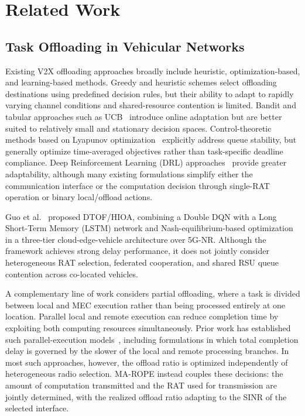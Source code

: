 \section{Related Work}

\subsection{Task Offloading in Vehicular Networks}

Existing V2X offloading approaches broadly include heuristic, optimization-based, and learning-based methods. Greedy and heuristic schemes select offloading destinations using predefined decision rules, but their ability to adapt to rapidly varying channel conditions and shared-resource contention is limited. Bandit and tabular approaches such as UCB~\cite{auer2002} introduce online adaptation but are better suited to relatively small and stationary decision spaces. Control-theoretic methods based on Lyapunov optimization~\cite{mao2016} explicitly address queue stability, but generally optimize time-averaged objectives rather than task-specific deadline compliance. Deep Reinforcement Learning (DRL) approaches~\cite{xiong2021,lowe2017} provide greater adaptability, although many existing formulations simplify either the communication interface or the computation decision through single-RAT operation or binary local/offload actions.

Guo et al.~\cite{guo2026} proposed DTOF/HIOA, combining a Double DQN with a Long Short-Term Memory (LSTM) network and Nash-equilibrium-based optimization in a three-tier cloud-edge-vehicle architecture over 5G-NR. Although the framework achieves strong delay performance, it does not jointly consider heterogeneous RAT selection, federated cooperation, and shared RSU queue contention across co-located vehicles.

A complementary line of work considers partial offloading, where a task is divided between local and MEC execution rather than being processed entirely at one location. Parallel local and remote execution can reduce completion time by exploiting both computing resources simultaneously. Prior work has established such parallel-execution models~\cite{mach2017}, including formulations in which total completion delay is governed by the slower of the local and remote processing branches. In most such approaches, however, the offload ratio is optimized independently of heterogeneous radio selection. MA-ROPE instead couples these decisions: the amount of computation transmitted and the RAT used for transmission are jointly determined, with the realized offload ratio adapting to the SINR of the selected interface.

